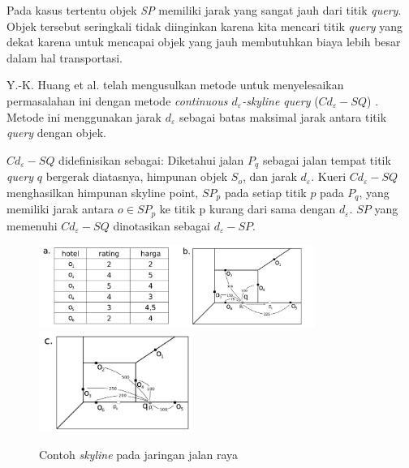 \documentclass[conference]{IEEEtran}
\begin{document}
Pada kasus tertentu objek \textit{SP} memiliki jarak yang sangat jauh dari titik \textit{query}. Objek tersebut seringkali tidak diinginkan karena kita mencari titik \textit{query} yang dekat karena untuk mencapai objek yang jauh membutuhkan biaya lebih besar dalam hal transportasi.

Y.-K. Huang et al. telah mengusulkan metode untuk menyelesaikan permasalahan ini dengan metode \textit{continuous $ d_\varepsilon $-skyline query} ($ Cd_\varepsilon-SQ $) \cite{continuousdbased}. Metode ini menggunakan jarak $ d_\varepsilon $ sebagai batas maksimal jarak antara titik \textit{query} dengan objek.

$ Cd_\varepsilon-SQ$ didefinisikan sebagai: Diketahui jalan $ P_q $ sebagai jalan tempat titik \textit{query} $ q $ bergerak diatasnya, himpunan objek $ S_o $, dan jarak $ d_\varepsilon $. Kueri $ Cd_\varepsilon-SQ $ menghasilkan himpunan skyline point, $ SP_p $ pada setiap titik $ p $ pada $ P_q $, yang memiliki jarak antara $ o \in SP_p $ ke titik p kurang dari sama dengan $ d_\varepsilon $. $ SP $ yang memenuhi $ Cd_\varepsilon-SQ $ dinotasikan sebagai $ d_\varepsilon-SP $.

\begin{figure}[H]
	\centering
	\includegraphics[width=9cm]{imgs/skylineroad-new.png}
	\includegraphics[width=5cm]{imgs/skylineroad-new-2.png}
	\caption{Contoh \textit{skyline} pada jaringan jalan raya}
	\label{fig:skyline-road}
\end{figure}
\end{document}
